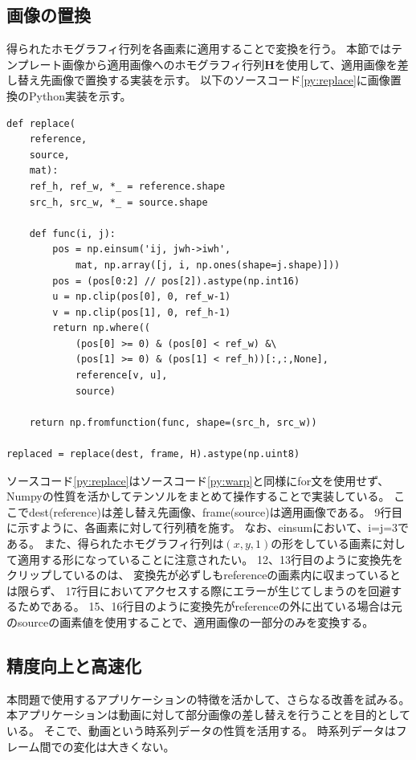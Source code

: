 \subsection{画像の置換}\label{sec:replace}
得られたホモグラフィ行列を各画素に適用することで変換を行う。
本節ではテンプレート画像から適用画像へのホモグラフィ行列$\bm{H}$を使用して、適用画像を差し替え先画像で置換する実装を示す。
以下のソースコード\ref{py:replace}に画像置換のPython実装を示す。
\begin{lstlisting}[caption=画像の置換, label=py:replace]
def replace(
    reference,
    source,
    mat):
    ref_h, ref_w, *_ = reference.shape
    src_h, src_w, *_ = source.shape

    def func(i, j):
        pos = np.einsum('ij, jwh->iwh',
            mat, np.array([j, i, np.ones(shape=j.shape)]))
        pos = (pos[0:2] // pos[2]).astype(np.int16)
        u = np.clip(pos[0], 0, ref_w-1)
        v = np.clip(pos[1], 0, ref_h-1)
        return np.where((
            (pos[0] >= 0) & (pos[0] < ref_w) &\
            (pos[1] >= 0) & (pos[1] < ref_h))[:,:,None],
            reference[v, u],
            source)

    return np.fromfunction(func, shape=(src_h, src_w))

replaced = replace(dest, frame, H).astype(np.uint8)
\end{lstlisting}
ソースコード\ref{py:replace}はソースコード\ref{py:warp}と同様にfor文を使用せず、
Numpyの性質を活かしてテンソルをまとめて操作することで実装している。
ここでdest(reference)は差し替え先画像、frame(source)は適用画像である。
9行目に示すように、各画素に対して行列積を施す。
なお、einsumにおいて、i=j=3である。
また、得られたホモグラフィ行列は$(x,y,1)$の形をしている画素に対して適用する形になっていることに注意されたい。
12、13行目のように変換先をクリップしているのは、
変換先が必ずしもreferenceの画素内に収まっているとは限らず、
17行目においてアクセスする際にエラーが生じてしまうのを回避するためである。
15、16行目のように変換先がreferenceの外に出ている場合は元のsourceの画素値を使用することで、適用画像の一部分のみを変換する。

\subsection{精度向上と高速化}\label{sec:acc_speed}
本問題で使用するアプリケーションの特徴を活かして、さらなる改善を試みる。
本アプリケーションは動画に対して部分画像の差し替えを行うことを目的としている。
そこで、動画という時系列データの性質を活用する。
時系列データはフレーム間での変化は大きくない。

